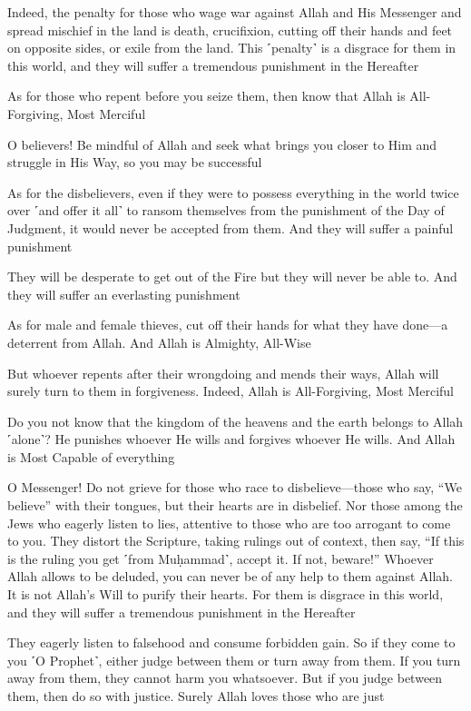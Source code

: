 Indeed, the penalty for those who wage war against Allah and His Messenger and spread mischief in the land is death, crucifixion, cutting off their hands and feet on opposite sides, or exile from the land. This ˹penalty˺ is a disgrace for them in this world, and they will suffer a tremendous punishment in the Hereafter

As for those who repent before you seize them, then know that Allah is All-Forgiving, Most Merciful

O believers! Be mindful of Allah and seek what brings you closer to Him and struggle in His Way, so you may be successful

As for the disbelievers, even if they were to possess everything in the world twice over ˹and offer it all˺ to ransom themselves from the punishment of the Day of Judgment, it would never be accepted from them. And they will suffer a painful punishment

They will be desperate to get out of the Fire but they will never be able to. And they will suffer an everlasting punishment

As for male and female thieves, cut off their hands for what they have done—a deterrent from Allah. And Allah is Almighty, All-Wise

But whoever repents after their wrongdoing and mends their ways, Allah will surely turn to them in forgiveness. Indeed, Allah is All-Forgiving, Most Merciful

Do you not know that the kingdom of the heavens and the earth belongs to Allah ˹alone˺? He punishes whoever He wills and forgives whoever He wills. And Allah is Most Capable of everything

O Messenger! Do not grieve for those who race to disbelieve—those who say, “We believe” with their tongues, but their hearts are in disbelief. Nor those among the Jews who eagerly listen to lies, attentive to those who are too arrogant to come to you. They distort the Scripture, taking rulings out of context, then say, “If this is the ruling you get ˹from Muḥammad˺, accept it. If not, beware!” Whoever Allah allows to be deluded, you can never be of any help to them against Allah. It is not Allah’s Will to purify their hearts. For them is disgrace in this world, and they will suffer a tremendous punishment in the Hereafter

They eagerly listen to falsehood and consume forbidden gain. So if they come to you ˹O Prophet˺, either judge between them or turn away from them. If you turn away from them, they cannot harm you whatsoever. But if you judge between them, then do so with justice. Surely Allah loves those who are just

